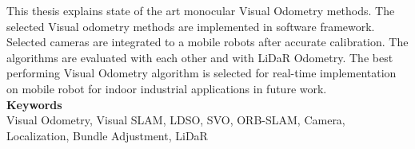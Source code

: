 \noindent
\normalsize
This thesis explains state of the art monocular Visual Odometry methods. The selected Visual odometry methods are implemented in software framework. Selected cameras are integrated to a mobile robots after accurate calibration. The algorithms are evaluated with each other and with LiDaR Odometry. The best performing Visual Odometry algorithm is selected for real-time implementation on mobile robot for indoor industrial applications in future work.  \\


\vspace{13pt}
\noindent\huge\textbf{Keywords} \\
\vspace{13pt}
\normalsize
\newline
Visual Odometry, Visual SLAM, LDSO, SVO, ORB-SLAM, Camera, Localization, Bundle Adjustment, LiDaR